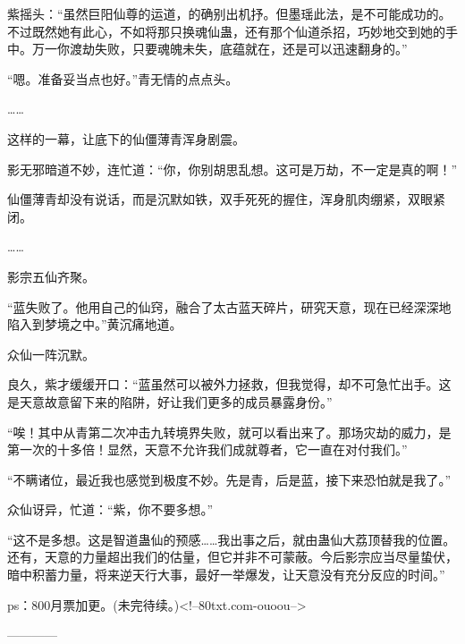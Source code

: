 \begin{this_body}
紫摇头：“虽然巨阳仙尊的运道，的确别出机抒。但墨瑶此法，是不可能成功的。不过既然她有此心，不如将那只换魂仙蛊，还有那个仙道杀招，巧妙地交到她的手中。万一你渡劫失败，只要魂魄未失，底蕴就在，还是可以迅速翻身的。”

“嗯。准备妥当点也好。”青无情的点点头。

……

这样的一幕，让底下的仙僵薄青浑身剧震。

影无邪暗道不妙，连忙道：“你，你别胡思乱想。这可是万劫，不一定是真的啊！”

仙僵薄青却没有说话，而是沉默如铁，双手死死的握住，浑身肌肉绷紧，双眼紧闭。

……

影宗五仙齐聚。

“蓝失败了。他用自己的仙窍，融合了太古蓝天碎片，研究天意，现在已经深深地陷入到梦境之中。”黄沉痛地道。

众仙一阵沉默。

良久，紫才缓缓开口：“蓝虽然可以被外力拯救，但我觉得，却不可急忙出手。这是天意故意留下来的陷阱，好让我们更多的成员暴露身份。”

“唉！其中从青第二次冲击九转境界失败，就可以看出来了。那场灾劫的威力，是第一次的十多倍！显然，天意不允许我们成就尊者，它一直在对付我们。”

“不瞒诸位，最近我也感觉到极度不妙。先是青，后是蓝，接下来恐怕就是我了。”

众仙讶异，忙道：“紫，你不要多想。”

“这不是多想。这是智道蛊仙的预感……我出事之后，就由蛊仙大荔顶替我的位置。还有，天意的力量超出我们的估量，但它并非不可蒙蔽。今后影宗应当尽量蛰伏，暗中积蓄力量，将来逆天行大事，最好一举爆发，让天意没有充分反应的时间。”

ps：800月票加更。(未完待续。)<!--80txt.com-ouoou-->

------------

\end{this_body}

